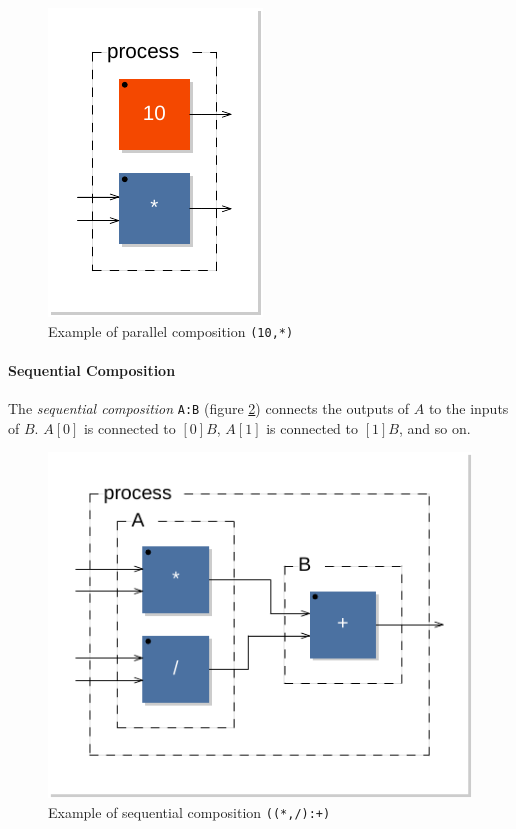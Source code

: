 \documentclass[a4paper]{book}
\begin{document}
\begin{figure}[h]
\centering
\includegraphics[scale=0.7]{images/par1}
\caption{Example of parallel composition  \lstinline'(10,*)'}
\label{figure:par1}
\end{figure}


\paragraph{Sequential Composition}
The \emph{sequential composition}  \lstinline$A:B$ (figure \ref{figure:seq1}) connects the outputs of  $A$ to the inputs of  $B$.  $A[0]$ is connected to $[0]B$,   $A[1]$ is connected to $[1]B$, and so on. 

\begin{figure}[h]
\centering 
\includegraphics[scale=0.7]{images/seq1}
\caption{Example of sequential composition  \lstinline'((*,/):+)' } 
\label{figure:seq1}
\end{figure}
\end{document}
